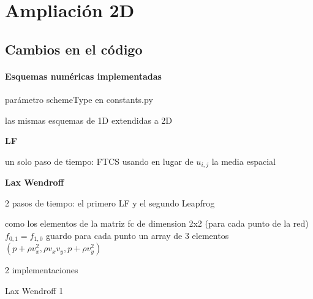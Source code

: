 \documentclass{article}
\begin{document}
\section{Ampliación 2D}
\subsection{Cambios  en el código}


\paragraph{Esquemas numéricas implementadas}  

\begin{description}
\item  parámetro schemeType en constants.py
\item las mismas esquemas de 1D extendidas  a 2D
\item \textbf{LF}
\item un solo paso de tiempo: FTCS usando en lugar de $u_{i,j}$ la media espacial
\item \textbf{Lax Wendroff} 
\item 2 pasos de tiempo: el primero LF y el segundo Leapfrog
\item como los elementos de la matriz fc de dimension 2x2 (para cada punto de la red)
 $f_{0,1} = f_{1,0}$  guardo para cada punto un array de 3 elementos $(p+\rho v_x^2, \rho v_x v_y, p+\rho v_y^2)$
\item 2 implementaciones


\item Lax Wendroff 1
\begin{figure}[ht]
  \centering
\end{figure}
\end{description}
\end{document}
